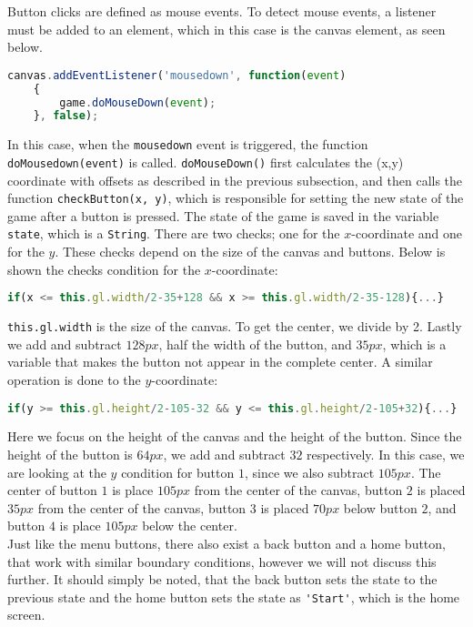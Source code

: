 Button clicks are defined as mouse events. To detect mouse events, a listener must be added to an element, which in this case is the canvas element, as seen below.

\begin{lstlisting}[language=JavaScript, caption=Add event listener to canvas]
canvas.addEventListener('mousedown', function(event)
	{
		game.doMouseDown(event);
	}, false);
\end{lstlisting}

In this case, when the \verb|mousedown| event is triggered, the function\\
\verb|doMousedown(event)| is called. \verb|doMouseDown()| first calculates the (x,y) coordinate with offsets as described in the previous subsection, and then calls the function \verb|checkButton(x, y)|, which is responsible for setting the new state of the game after a button is pressed. The state of the game is saved in the variable \verb|state|, which is a \verb|String|. There are two checks; one for the $x$-coordinate and one for the $y$. These checks depend on the size of the canvas and buttons. Below is shown the checks condition for the $x$-coordinate:

\begin{lstlisting}[language=JavaScript, caption=x condition check for menu buttons]
if(x <= this.gl.width/2-35+128 && x >= this.gl.width/2-35-128){...}
\end{lstlisting}

\verb|this.gl.width| is the size of the canvas. To get the center, we divide by 2. Lastly we add and subtract $128px$, half the width of the button, and $35px$, which is a variable that makes the button not appear in the complete center. A similar operation is done to the $y$-coordinate:

\begin{lstlisting}[language=JavaScript, caption=y condition check for menu buttons]
if(y >= this.gl.height/2-105-32 && y <= this.gl.height/2-105+32){...}
\end{lstlisting}

Here we focus on the height of the canvas and the height of the button. Since the height of the button is $64px$, we add and subtract $32$ respectively. In this case, we are looking at the $y$ condition for button $1$, since we also subtract $105px$. The center of button $1$ is place $105px$ from the center of the canvas, button $2$ is placed $35px$ from the center of the canvas, button $3$ is placed $70px$ below button $2$, and button $4$ is place $105px$ below the center.\\

Just like the menu buttons, there also exist a back button and a home button, that work with similar boundary conditions, however we will not discuss this further. It should simply be noted, that the back button sets the state to the previous state and the home button sets the state as \verb|'Start'|, which is the home screen.